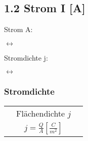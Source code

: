 \subsection*{1.2 Strom I [A]}
Strom A:

\vspace{-1mm}\begin{minipage}{0.4\linewidth}
    \begin{footnotesize}
        \begin{center}
            
        \end{center}
    \end{footnotesize}
\end{minipage}
$\longleftrightarrow$
\begin{minipage}{0.4\linewidth}
    \begin{footnotesize}
        \begin{center}
        \end{center}
    \end{footnotesize}
\end{minipage}
\vspace{1mm}

Stromdichte j:

\vspace{-1mm}\begin{minipage}{0.25\linewidth}
    \begin{footnotesize}
        \begin{center}
            
        \end{center}
    \end{footnotesize}
\end{minipage}
$\longleftrightarrow$
\begin{minipage}{0.55\linewidth}
    \begin{footnotesize}
        \begin{center}
        \end{center}
    \end{footnotesize}
\end{minipage}
\vspace{1mm}

\subsubsection{Stromdichte}
\begin{tabular}{c c c}
    & Flächendichte $j$ &\\
    & $j = \frac{Q}{A} \left[\frac{C}{m^2}\right]$ &
\end{tabular}

